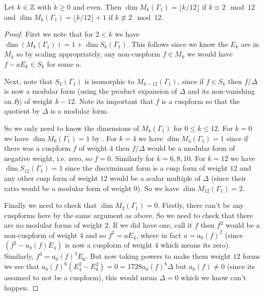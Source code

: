 \begin{theorem}\label{thm:lvl1_dims}\leanok
    Let $k \in \mathbb{Z}$ with $k \ge 0$ and even. Then $\dim M_k(\Gamma_1) = \lfloor k / 12 \rfloor $ if $k \equiv 2 \mod 12$ and $\dim M_k(\Gamma_1) = \lfloor k / 12 \rfloor + 1$ if $k \not\equiv 2 \mod 12$.
\end{theorem}
\begin{proof}
\leanok
First we note that for $2 < k$ we have $\dim(M_k(\Gamma_1)) = 1 + \dim S_k(\Gamma_1)$. This follows since we know the $E_k$ are in $M_k$ so by scaling appropriately, any non-cuspform $f \in M_k$ we would have $f - a E_k \in S_k$ for some $a$.

Next, note that  $S_k(\Gamma_1)$ is isomorphic to $M_{k-12}(\Gamma_1)$, since if $f \in S_k$ then $f/ \Delta$ is now a modular form (using the product expansion of $\Delta$ and its non-vanishing on $\mathfrak{H}$) of weight $k-12$. Note its important that $f$ is a cuspform so that the quotient by $\Delta$ is a modular form.

So we only need to know the dimensions of $M_k(\Gamma_1)$ for $0 \le k \le 12$. For $k = 0$ we have $\dim M_0(\Gamma_1) = 1$ by .  For $k = 4$ we have $\dim M_4(\Gamma_1) = 1$ since if there was a cuspform $f$ of weight $4$ then $f/ \Delta$ would be a modular form of negative weight, i.e. zero, so $f=0$. Similarly for $k=6,8,10$. For $k=12$ we have $\dim S_{12}(\Gamma_1) = 1$ since the discriminant form is a cusp form of weight $12$ and any other cusp form of weight $12$ would be a scalar multiple of $\Delta$ (since their ratio would be a modular form of weight $0$). So we have $\dim M_{12}(\Gamma_1) = 2$.

Finally we need to check that $\dim M_2(\Gamma_1) = 0$. Firstly, there can't be any cuspforms here by the same argument as above. So we need to check that there are no modular forms of weight $2$. If we did have one, call it $f$ then $f^2$ would be a non-cuspform of weight $4$ and so $f^2 = a E_4$, where in fact $a=a_0(f)^2$ (since $(f^2-a_0(f)E_4)$ is now a cuspform of weight $4$ which means its zero). Similarly, $f^3 = a_0(f)^3 E_6$. But now taking powers to make them weight $12$ forms we see that $a_0(f)^6(E_4^3 - E_6^2) = 0 = 1728 a_0(f)^6 \Delta$
but $a_0(f) \ne 0$ (since its assumed to not be a cuspform), this would mean $\Delta =0$ which we know can't happen.
\end{proof}

